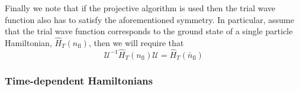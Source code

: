Finally  we  note  that   if  the projective  algorithm is  used  then   the  trial  wave  function  also has  to satisfy  the   aforementioned  symmetry.
In particular,
assume  that  the   trial wave function    corresponds  to the  ground state of a  single  particle  Hamiltonian,   $\hat{H}_T(n_\mathrm{fl}) $,  then  we
will require  that
\begin{equation}
\mathcal{U}^{-1}   \hat{H}_T(n_\mathrm{fl})  \mathcal{U} = \hat{H}_T(\bar{n}_\mathrm{fl})
\end{equation}

\subsubsection{Time-dependent Hamiltonians}\label{sec:time}

